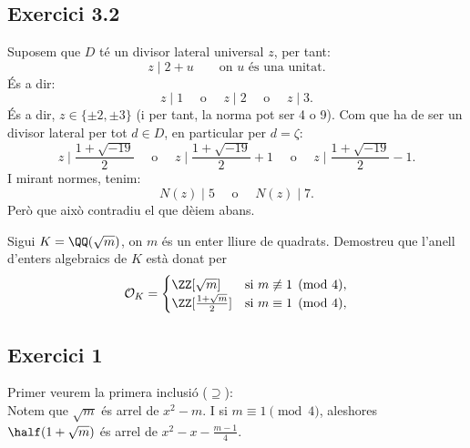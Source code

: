 \documentclass[11pt, a4paper]{article}
\begin{document}
    \subsection{Exercici 3.2}
    Suposem que $D$ té un divisor lateral universal $z$, per tant:
    \[
        z\mid 2+u\qquad \text{on $u$ és una unitat.}
    \]
    És a dir:
    \[
        z\mid 1\quad\text{ o }\quad z\mid 2\quad \text{ o }\quad z\mid3.
    \]
    És a dir, $z\in \{\pm2,\pm3\}$ (i per tant, la norma pot ser 4 o 9). Com que ha de ser un divisor lateral per tot $d\in D$, en particular per $d=\zeta$:
    \[
        z\mid \frac{1+\sqrt{-19}}{2}
        \quad
        \text{ o }
        \quad
        z\mid \frac{1+\sqrt{-19}}{2}+1
        \quad
        \text{ o }
        \quad
        z\mid \frac{1+\sqrt{-19}}{2}-1.
    \]
    I mirant normes, tenim:
    \[
        N(z)\mid 5
        \quad
        \text{ o }
        \quad
        N(z)\mid 7.
    \]
    Però que això contradiu el que dèiem abans.
    \newpage
    \begin{tcolorbox}[title=\section{FP 4 Exercici 1}]
        Sigui $K=\QQ(\sqrt{m})$, on $m$ és un enter lliure de quadrats. Demostreu que l'anell d'enters algebraics de $K$ està donat per
        \[
            \mathcal{O}_K=\begin{cases}
                \ZZ[\sqrt m]& \text{si }m\not \equiv 1\pmod4,\\
                \ZZ[\frac{1+\sqrt m}2]& \text{si }m \equiv 1\pmod4,\\
            \end{cases}
        \]
    \end{tcolorbox}
    \subsection{Exercici 1}
    Primer veurem la primera inclusió ($\supseteq$):\\
    Notem que $\sqrt{m}$ és arrel de $x^2-m$. I si $m\equiv1\pmod4$, aleshores $\half(1+\sqrt{m})$ és arrel de $x^2-x-\frac{m-1}{4}$.\par
\end{document}

